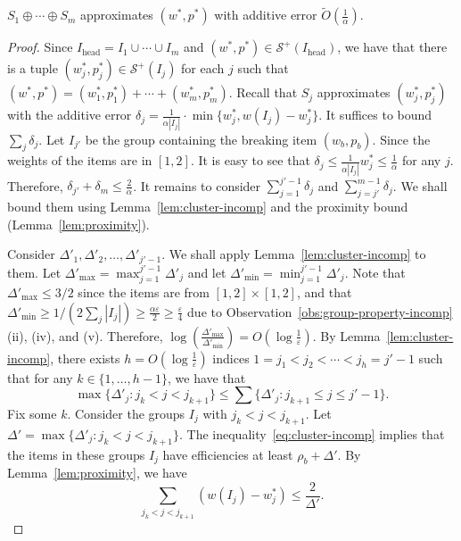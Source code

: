 \documentclass[a4paper,UKenglish,cleveref, autoref, thm-restate, pdfa]{lipics-v2021}
\newcommand{\eps}{\varepsilon}
\renewcommand{\leq}{\leqslant}
\renewcommand{\geq}{\geqslant}
\begin{document}
\begin{lemma}
    $S_1 \oplus \cdots \oplus S_m$ approximates $(w^*, p^*)$ with additive error $\tilde{O}(\frac{1}{\alpha})$.
\end{lemma}
\begin{proof}
    Since $I_{\mathrm{head}} = I_1 \cup \cdots \cup I_m$ and $(w^*, p^*) \in \mathcal{S}^+(I_{\mathrm{head}})$, we have that there is a tuple $(w^*_j, p^*_j) \in \mathcal{S}^+(I_j)$ for each $j$ such that 
    \(
        (w^*, p^*) = (w^*_1, p^*_1) + \cdots + (w^*_m, p^*_m).
    \)
    Recall that $S_j$ approximates $(w^*_j, p^*_j)$ with the additive error $\delta_j = \frac{1}{\alpha|I_j|}\cdot\min\{w^*_j,w(I_j)-w^*_j\}$. It suffices to bound $\sum_j \delta_j$. Let $I_{j'}$ be the group containing the breaking item $(w_b, p_b)$. Since the weights of the items are in $[1,2]$. It is easy to see that 
    \(
        \delta_{j} \leq \frac{1}{\alpha|I_{j}|}w^*_{j} \leq \frac{1}{\alpha}
    \)
    for any $j$.
    Therefore, $\delta_{j'} + \delta_{m} \leq \frac{2}{\alpha}$. It remains to consider $\sum_{j = 1}^{j'-1} \delta_j$ and $\sum_{j = j'}^{m-1} \delta_j$. We shall bound them using Lemma~\ref{lem:cluster-incomp} and the proximity bound (Lemma~\ref{lem:proximity}).

    Consider $\Delta'_1, \Delta'_2, \ldots, \Delta'_{j'-1}$. We shall apply Lemma~\ref{lem:cluster-incomp} to them. Let $\Delta'_{\max} = \max_{j=1}^{j'-1}\Delta'_j$ and let $\Delta'_{\min} = \min_{j=1}^{j'-1}\Delta'_j$.  Note that $\Delta'_{\max} \leq 3/2$ since the items are from $[1,2] \times [1,2]$, and that \(
    \Delta'_{\min} \geq 1/(2\sum_j |I_j|) \geq \frac{\alpha\eps}{2} \geq \frac{\eps}{4}
    \) due to Observation~\ref{obs:group-property-incomp}(ii), (iv), and (v). Therefore, $\log(\frac{\Delta'_{\max}}{\Delta'_{\min}}) = O(\log \frac{1}{\eps})$.  By Lemma~\ref{lem:cluster-incomp}, there exists $h = O(\log \frac{1}{\eps})$ indices $1 = j_1 < j_2 < \cdots < j_h = j' - 1$ such that for any $k \in \{1, \ldots, h-1\}$, we have that
    \begin{equation}\label{eq:cluster-incomp}
            \max\{\Delta'_j : j_k < j < j_{k+1}\} \leq \sum\{\Delta'_j : j_{k+1} \leq j \leq j'-1\}.
   \end{equation}
   Fix some $k$. Consider the groups $I_j$ with $j_k < j < j_{k+1}$. Let $\Delta' = \max\{\Delta'_j : j_k < j < j_{k+1}\}$. The inequality~\eqref{eq:cluster-incomp} implies that the items in these groups $I_j$ have efficiencies at least $\rho_b + \Delta'$. By Lemma~\ref{lem:proximity}, we have 
   \begin{equation}\label{eq:proximity-bound-b-incomp}
        \sum_{j_k < j < j_{k+1}} (w(I_j) - w^*_j) \leq \frac{2}{\Delta'}.  
   \end{equation}


\end{proof}
\end{document}
